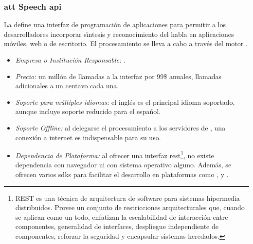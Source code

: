 \subsubsection{\gls{att} Speech \gls{api}}
\label{sec:att}

La  \cite{AttSpeech} define una interfaz de programaci\'on de aplicaciones para permitir
a los desarrolladores incorporar s{\'\i}ntesis y reconocimiento del habla en aplicaciones m\'oviles,
web o de escritorio. El procesamiento se lleva a cabo a trav\'es del motor .

\begin{itemize}
	\item \emph{Empresa o Instituci\'on Responsable:} .
	\item \emph{Precio:} un mill\'on de llamadas a la interfaz por 99\$ anuales, llamadas adicionales a un centavo
	cada una.
	\item \emph{Soporte para m\'ultiples idiomas:} el ingl\'es es el principal idioma soportado, aunque incluye
	soporte reducido para el espa\~nol.
	\item \emph{Soporte Offline:} al delegarse el procesamiento a los servidores de ,
	una conexi\'on a internet es indispensable para su uso.
    \item \emph{Dependencia de Plataforma:} al ofrecer una interfaz \gls{rest}\footnote{REST es una t\'ecnica de
        arquitectura de software para sistemas hipermedia distribuidos. Provee un conjunto de restricciones arquitecturales
        que, cuando se aplican como un todo, enfatizan la escalabilidad de interacci\'on entre componentes, generalidad
        de interfaces, despliegue independiente de componentes, reforzar la seguridad y encapsular sistemas heredados\cite{Fielding2000}.}, 
    no existe dependencia con navegador
	ni con sistema operativo alguno. Adem\'as, se ofrecen varios \gls{sdk}s para facilitar
	el desarrollo en plataformas como ,  y .
\end{itemize}
